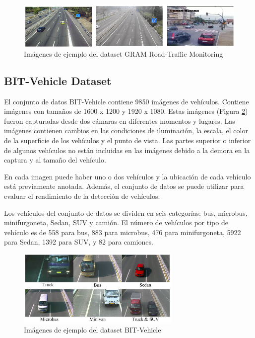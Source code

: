 \begin{figure}
\begin{center}
	\includegraphics[width=1\textwidth]{figures/Estado_arte/gram.png}
   \caption{Imágenes de ejemplo del dataset GRAM Road-Traffic Monitoring}
	\label{fig.gram}
\end{center}
\end{figure}

\subsection{BIT-Vehicle Dataset}

El conjunto de datos BIT-Vehicle \cite{bit} contiene 9850 imágenes de vehículos. Contiene imágenes con tamaños de 1600 x 1200 y 1920 x 1080. Estas imágenes (Figura \ref{fig.bit}) fueron capturadas desde dos cámaras en diferentes momentos y lugares. Las imágenes contienen cambios en las condiciones de iluminación, la escala, el color de la superficie de los vehículos y el punto de vista. Las partes superior o inferior de algunos vehículos no están incluidas en las imágenes debido a la demora en la captura y al tamaño del vehículo. 

En cada imagen puede haber uno o dos vehículos y la ubicación de cada vehículo está previamente anotada. Además, el conjunto de datos se puede utilizar para evaluar el rendimiento de la detección de vehículos.

Los vehículos del conjunto de datos se dividen en seis categorías: bus, microbus, minifurgoneta, Sedan, SUV y camión. El número de vehículos por tipo de vehículo es de 558 para bus, 883 para microbus, 476 para minifurgoneta, 5922 para Sedan, 1392 para SUV, y 82 para camiones.

\begin{figure}
\begin{center}
	\includegraphics[width=0.7\textwidth]{figures/Estado_arte/bit.png}
   \caption{Imágenes de ejemplo del dataset BIT-Vehicle}
	\label{fig.bit}
\end{center}
\end{figure}

